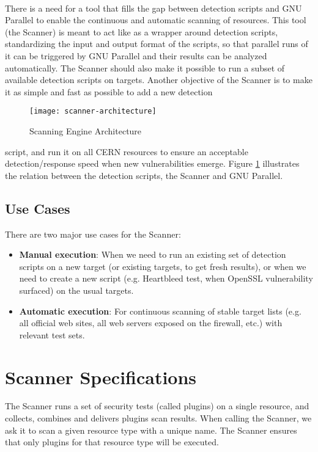 \paragraph{}
There is a need for a tool that fills the gap between detection scripts and GNU Parallel to enable the continuous and automatic scanning of resources. This tool (the Scanner) is meant to act like as a wrapper around detection scripts, standardizing the input and output format of the scripts, so that parallel runs of it can be triggered by GNU Parallel and their results can be analyzed automatically. The Scanner should also make it possible to run a subset of available detection scripts on targets. Another objective of the Scanner is to make it as simple and fast as possible to add a new detection
\begin{figure}[H]

  \centering
    \texttt{[image: scanner-architecture]}
  \caption{Scanning Engine Architecture}
\label{figure:scanner-arch}
\end{figure}
\noindent
script, and run it on all CERN resources to ensure an acceptable detection/response speed when new vulnerabilities emerge. Figure \ref{figure:scanner-arch} illustrates the relation between the detection scripts, the Scanner and GNU Parallel. 




\subsection{Use Cases}
There are two major use cases for the Scanner:
\begin{itemize}
\item \textbf{Manual execution}: When we need to run an existing set of detection scripts on a new target (or existing targets, to get fresh results), or when we need to create a new script (e.g. Heartbleed test, when OpenSSL vulnerability surfaced) on the usual targets.
\item \textbf{Automatic execution}: For continuous scanning of stable target lists (e.g. all official web sites, all web servers exposed on the firewall, etc.) with relevant test sets.
\end{itemize}

\section{Scanner Specifications}
The Scanner runs a set of security tests (called plugins) on a single resource, and collects, combines and delivers plugins scan results. When calling the Scanner, we ask it to scan a given resource type with a unique name. The Scanner ensures that only plugins for that resource type will be executed. 

